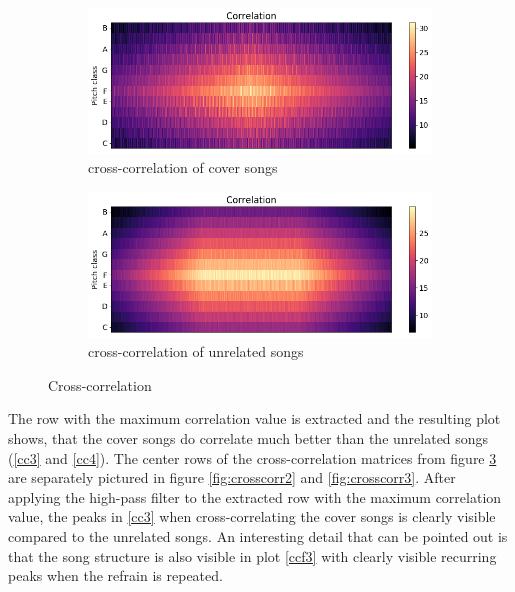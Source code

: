 \begin{figure}[htbp]
{{			\begin{subfigure}{.495\textwidth}
				\centering    
				\includegraphics[scale=0.3]{Images/Chroma/cross_hurricane.png}
				\caption{cross-correlation of cover songs}
				\label{cc1}
			\end{subfigure}		
			\begin{subfigure}{.495\textwidth}
				\centering     
				\includegraphics[scale=0.3]{Images/Chroma/cross_hurricane_sia.png}
				\caption{cross-correlation of unrelated songs}
				\label{cc2}
			\end{subfigure}%
	}}
	\caption{Cross-correlation}
	\label{fig:crosscorr}
\end{figure}
The row with the maximum correlation value is extracted and the resulting plot shows, that the cover songs do correlate much better than the unrelated songs (\ref{cc3} and \ref{cc4}).
The center rows of the cross-correlation matrices from figure \ref{fig:crosscorr} are separately pictured in figure \ref{fig:crosscorr2} and \ref{fig:crosscorr3}. After applying the high-pass filter to the extracted row with the maximum correlation value, the peaks in \ref{cc3} when cross-correlating the cover songs is clearly visible compared to the unrelated songs. An interesting detail that can be pointed out is that the song structure is also visible in plot \ref{ccf3} with clearly visible recurring peaks when the refrain is repeated.
